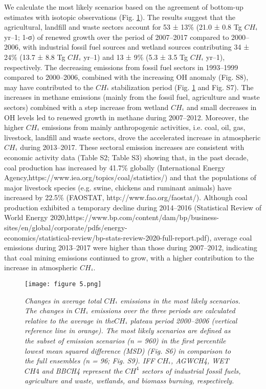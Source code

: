 \documentclass[a4paper,12pt]{article}
\begin{document}
\small{We calculate the most likely scenarios based on the agreement of bottom-up estimates with isotopic observations (Fig. \ref{fig5:my_label}). The results suggest that the agricultural, landfill and waste sectors account for 53 ± 13\% (21.0 ± 0.8 Tg $CH_^{4}$ yr–1; 1-σ) of renewed growth over the period of 2007–2017 compared to 2000–2006, with industrial fossil fuel sources and wetland sources contributing 34 ± 24\% (13.7 ± 8.8 Tg $CH_^{4}$ yr–1) and 13 ± 9\% (5.3 ± 3.5 Tg $CH_^{4}$ yr–1), respectively. The decreasing emissions from fossil fuel sectors in 1993–1999 compared to 2000–2006, combined with the increasing OH anomaly (Fig. S8), may have contributed to the $CH_^{4}$ stabilization period (Fig. \ref{fig5:my_label} and Fig. S7). The increases in methane emissions (mainly from the fossil fuel, agriculture and waste sectors) combined with a step increase from wetland $CH_^{4}$ and small decreases in OH levels led to renewed growth in methane during 2007–2012. Moreover, the higher $CH_^{4}$ emissions from mainly anthropogenic activities, i.e. coal, oil, gas, livestock, landfill and waste sectors, drove the accelerated increase in atmospheric $CH_^{4}$ during 2013–2017. These sectoral emission increases are consistent with economic activity data (Table S2; Table S3) showing that, in the past decade, coal production has increased by 41.7\% globally (International Energy Agency,https://www.iea.org/topics/coal/statistics/) and that the populations of major livestock species (e.g. swine, chickens and ruminant animals) have increased by 22.5\% (FAOSTAT, http://www.fao.org/faostat/). Although coal production exhibited a temporary decline during 2014–2016 (Statistical Review of World Energy 2020,https://www.bp.com/content/dam/bp/business-sites/en/global/corporate/pdfs/energy- \\economics/statistical-review/bp-stats-review-2020-full-report.pdf), average coal emissions during 2013–2017 were higher than those during 2007–2012, indicating that coal mining emissions continued to grow, with a higher contribution to the increase in atmospheric $CH_^{4}$.}
  
\begin{figure}[H]
    \caption{}
    \texttt{[image: figure 5.png]}
    \label{fig5:my_label}

\textit{\scriptsize{Changes in average total $CH_^{4}$ emissions in the most likely scenarios. The changes in $CH_^{4}$ emissions over the three periods are calculated relative to the average in the$CH_^{4}$ plateau period 2000–2006 (vertical reference line in orange). The most likely scenarios are defined as the subset of emission scenarios (n = 960) in the first percentile lowest mean squared difference (MSD) (Fig. S6) in comparison to the full ensembles (n = 96; Fig. S9). IFF $CH_^{4}$, AGWCH4, WET${CH4}$ and BBCH4 represent the $CH^{4}$ sectors of industrial fossil fuels, agriculture and waste, wetlands, and biomass burning, respectively.}}
\end{figure}
\end{document}
